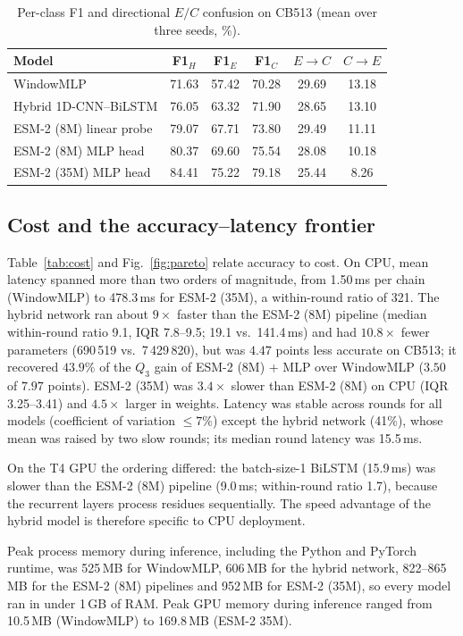 \documentclass[preprint,12pt,authoryear]{elsarticle}
\begin{document}
\begin{table}[htbp]
\centering
\scriptsize
\caption{Per-class F1 and directional $E/C$ confusion on CB513 (mean over three seeds, \%).}
\label{tab:perclass}
\begin{tabular}{lccccc}
\toprule
\textbf{Model} & \textbf{F1$_H$} & \textbf{F1$_E$} & \textbf{F1$_C$} & \textbf{$E\to C$} & \textbf{$C\to E$} \\
\midrule
WindowMLP & 71.63 & 57.42 & 70.28 & 29.69 & 13.18 \\
Hybrid 1D-CNN--BiLSTM & 76.05 & 63.32 & 71.90 & 28.65 & 13.10 \\
ESM-2 (8M) linear probe & 79.07 & 67.71 & 73.80 & 29.49 & 11.11 \\
ESM-2 (8M) MLP head & 80.37 & 69.60 & 75.54 & 28.08 & 10.18 \\
ESM-2 (35M) MLP head & 84.41 & 75.22 & 79.18 & 25.44 & 8.26 \\
\bottomrule
\end{tabular}
\end{table}

\subsection{Cost and the accuracy--latency frontier}
Table~\ref{tab:cost} and Fig.~\ref{fig:pareto} relate accuracy to cost. On CPU, mean latency spanned more than two orders of magnitude, from 1.50\,ms per chain (WindowMLP) to 478.3\,ms for ESM-2 (35M), a within-round ratio of 321. The hybrid network ran about $9\times$ faster than the ESM-2 (8M) pipeline (median within-round ratio 9.1, IQR 7.8--9.5; 19.1 vs.\ 141.4\,ms) and had $10.8\times$ fewer parameters (690\,519 vs.\ 7\,429\,820), but was $4.47$ points less accurate on CB513; it recovered $43.9\%$ of the $Q_3$ gain of ESM-2 (8M) + MLP over WindowMLP ($3.50$ of $7.97$ points). ESM-2 (35M) was $3.4\times$ slower than ESM-2 (8M) on CPU (IQR 3.25--3.41) and $4.5\times$ larger in weights. Latency was stable across rounds for all models (coefficient of variation $\leq 7\%$) except the hybrid network (41\%), whose mean was raised by two slow rounds; its median round latency was 15.5\,ms.

On the T4 GPU the ordering differed: the batch-size-1 BiLSTM (15.9\,ms) was slower than the ESM-2 (8M) pipeline (9.0\,ms; within-round ratio 1.7), because the recurrent layers process residues sequentially. The speed advantage of the hybrid model is therefore specific to CPU deployment.

Peak process memory during inference, including the Python and PyTorch runtime, was 525\,MB for WindowMLP, 606\,MB for the hybrid network, 822--865\,MB for the ESM-2 (8M) pipelines and 952\,MB for ESM-2 (35M), so every model ran in under 1\,GB of RAM. Peak GPU memory during inference ranged from 10.5\,MB (WindowMLP) to 169.8\,MB (ESM-2 35M).
\end{document}
